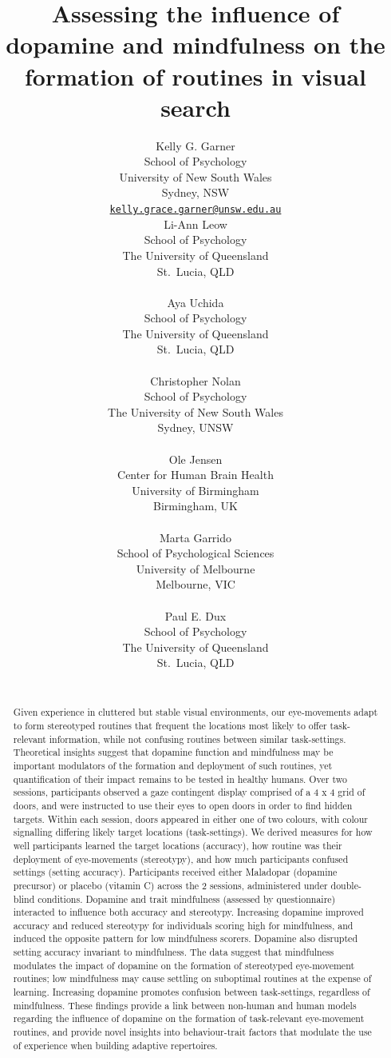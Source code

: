 \documentclass{article}
\title{Assessing the influence of dopamine and mindfulness on the
formation of routines in visual search}
\author{
    Kelly G. Garner
   \\
    School of Psychology \\
    University of New South Wales \\
  Sydney, NSW \\
  \texttt{\href{mailto:kelly.grace.garner@unsw.edu.au}{\nolinkurl{kelly.grace.garner@unsw.edu.au}}} \\
   \And
    Li-Ann Leow
   \\
    School of Psychology \\
    The University of Queensland \\
  St.~Lucia, QLD \\
  \texttt{} \\
   \And
    Aya Uchida
   \\
    School of Psychology \\
    The University of Queensland \\
  St.~Lucia, QLD \\
  \texttt{} \\
   \And
    Christopher Nolan
   \\
    School of Psychology \\
    The University of New South Wales \\
  Sydney, UNSW \\
  \texttt{} \\
   \And
    Ole Jensen
   \\
    Center for Human Brain Health \\
    University of Birmingham \\
  Birmingham, UK \\
  \texttt{} \\
   \And
    Marta Garrido
   \\
    School of Psychological Sciences \\
    University of Melbourne \\
  Melbourne, VIC \\
  \texttt{} \\
   \And
    Paul E. Dux
   \\
    School of Psychology \\
    The University of Queensland \\
  St.~Lucia, QLD \\
  \texttt{} \\
  }
\begin{document}
\maketitle


\begin{abstract}
Given experience in cluttered but stable visual environments, our
eye-movements adapt to form stereotyped routines that frequent the
locations most likely to offer task-relevant information, while not
confusing routines between similar task-settings. Theoretical insights
suggest that dopamine function and mindfulness may be important
modulators of the formation and deployment of such routines, yet
quantification of their impact remains to be tested in healthy humans.
Over two sessions, participants observed a gaze contingent display
comprised of a 4 x 4 grid of doors, and were instructed to use their
eyes to open doors in order to find hidden targets. Within each session,
doors appeared in either one of two colours, with colour signalling
differing likely target locations (task-settings). We derived measures
for how well participants learned the target locations (accuracy), how
routine was their deployment of eye-movements (stereotypy), and how much
participants confused settings (setting accuracy). Participants received
either Maladopar (dopamine precursor) or placebo (vitamin C) across the
2 sessions, administered under double-blind conditions. Dopamine and
trait mindfulness (assessed by questionnaire) interacted to influence
both accuracy and stereotypy. Increasing dopamine improved accuracy and
reduced stereotypy for individuals scoring high for mindfulness, and
induced the opposite pattern for low mindfulness scorers. Dopamine also
disrupted setting accuracy invariant to mindfulness. The data suggest
that mindfulness modulates the impact of dopamine on the formation of
stereotyped eye-movement routines; low mindfulness may cause settling on
suboptimal routines at the expense of learning. Increasing dopamine
promotes confusion between task-settings, regardless of mindfulness.
These findings provide a link between non-human and human models
regarding the influence of dopamine on the formation of task-relevant
eye-movement routines, and provide novel insights into behaviour-trait
factors that modulate the use of experience when building adaptive
repertoires.
\end{abstract}

\end{document}
